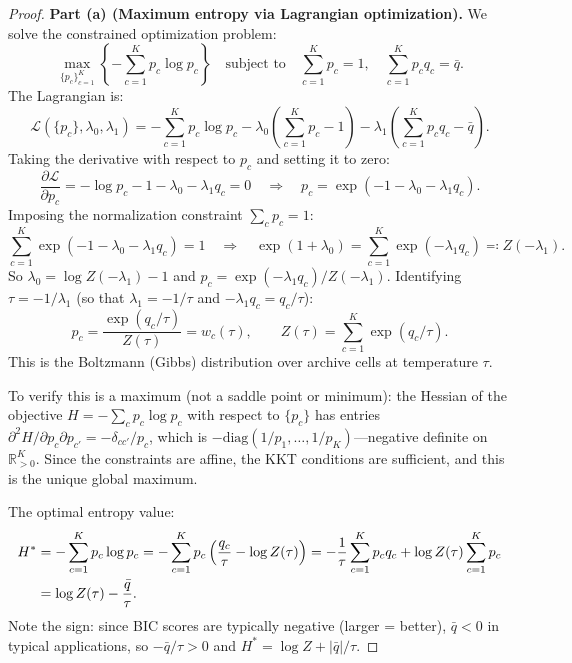 \documentclass{article}
\theoremstyle{definition}
\theoremstyle{plain}
\theoremstyle{remark}
\begin{document}
\begin{proof}
\textbf{Part (a) (Maximum entropy via Lagrangian optimization).}
We solve the constrained optimization problem:
\begin{equation}
  \max_{\{p_c\}_{c=1}^K} \left\{-\sum_{c=1}^K p_c \log p_c\right\}
  \quad \text{subject to} \quad \sum_{c=1}^K p_c = 1, \quad
  \sum_{c=1}^K p_c q_c = \bar{q}.
\end{equation}
The Lagrangian is:
\begin{equation}
  \mathcal{L}(\{p_c\}, \lambda_0, \lambda_1) = -\sum_{c=1}^K p_c \log p_c
  - \lambda_0\!\left(\sum_{c=1}^K p_c - 1\right)
  - \lambda_1\!\left(\sum_{c=1}^K p_c q_c - \bar{q}\right).
\end{equation}
Taking the derivative with respect to $p_c$ and setting it to zero:
\begin{equation}
  \frac{\partial \mathcal{L}}{\partial p_c} = -\log p_c - 1 - \lambda_0 - \lambda_1 q_c = 0
  \quad \Longrightarrow \quad
  p_c = \exp(-1 - \lambda_0 - \lambda_1 q_c).
\end{equation}
Imposing the normalization constraint $\sum_c p_c = 1$:
\begin{equation}
  \sum_{c=1}^K \exp(-1 - \lambda_0 - \lambda_1 q_c) = 1
  \quad \Longrightarrow \quad
  \exp(1 + \lambda_0) = \sum_{c=1}^K \exp(-\lambda_1 q_c) \eqqcolon Z(-\lambda_1).
\end{equation}
So $\lambda_0 = \log Z(-\lambda_1) - 1$ and
$p_c = \exp(-\lambda_1 q_c) / Z(-\lambda_1)$. Identifying $\tau = -1/\lambda_1$
(so that $\lambda_1 = -1/\tau$ and $-\lambda_1 q_c = q_c/\tau$):
\begin{equation}
  p_c = \frac{\exp(q_c/\tau)}{Z(\tau)} = w_c(\tau), \qquad
  Z(\tau) = \sum_{c=1}^K \exp(q_c/\tau).
\end{equation}
This is the Boltzmann (Gibbs) distribution over archive cells at temperature $\tau$.

To verify this is a maximum (not a saddle point or minimum): the Hessian of the objective
$H = -\sum_c p_c \log p_c$ with respect to $\{p_c\}$ has entries
$\partial^2 H / \partial p_c \partial p_{c'} = -\delta_{cc'}/p_c$, which is
$-\mathrm{diag}(1/p_1, \ldots, 1/p_K)$---negative definite on $\mathbb{R}^K_{>0}$.
Since the constraints are affine, the KKT conditions are sufficient, and this is the
unique global maximum.

The optimal entropy value:
\begin{align}
  H^* &= -\sum_{c=1}^K p_c \log p_c
  = -\sum_{c=1}^K p_c \left(\frac{q_c}{\tau} - \log Z(\tau)\right)
  = -\frac{1}{\tau}\sum_{c=1}^K p_c q_c + \log Z(\tau) \sum_{c=1}^K p_c \\
  &= \log Z(\tau) - \frac{\bar{q}}{\tau}. \notag
\end{align}
Note the sign: since BIC scores are typically negative (larger = better), $\bar{q} < 0$
in typical applications, so $-\bar{q}/\tau > 0$ and $H^* = \log Z + |\bar{q}|/\tau$.


\end{proof}
\end{document}
